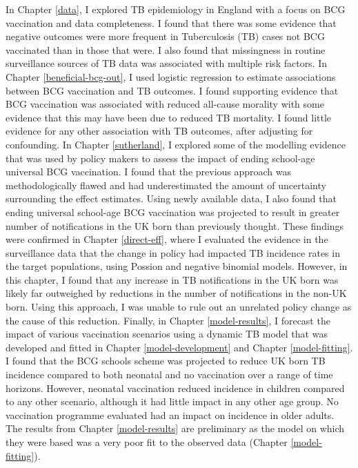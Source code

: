 \documentclass[11pt,twoside]{bristolthesis}
\begin{document}
  In Chapter \ref{data}, I explored TB epidemiology in England with a focus on BCG vaccination and data completeness. I found that there was some evidence that negative outcomes were more frequent in Tuberculosis (TB) cases not BCG vaccinated than in those that were. I also found that missingness in routine surveillance sources of TB data was associated with multiple risk factors. In Chapter \ref{beneficial-bcg-out}, I used logistic regression to estimate associations between BCG vaccination and TB outcomes. I found supporting evidence that BCG vaccination was associated with reduced all-cause morality with some evidence that this may have been due to reduced TB mortality. I found little evidence for any other association with TB outcomes, after adjusting for confounding. In Chapter \ref{sutherland}, I explored some of the modelling evidence that was used by policy makers to assess the impact of ending school-age universal BCG vaccination. I found that the previous approach was methodologically flawed and had underestimated the amount of uncertainty surrounding the effect estimates. Using newly available data, I also found that ending universal school-age BCG vaccination was projected to result in greater number of notifications in the UK born than previously thought. These findings were confirmed in Chapter \ref{direct-eff}, where I evaluated the evidence in the surveillance data that the change in policy had impacted TB incidence rates in the target populations, using Possion and negative binomial models. However, in this chapter, I found that any increase in TB notifications in the UK born was likely far outweighed by reductions in the number of notifications in the non-UK born. Using this approach, I was unable to rule out an unrelated policy change as the cause of this reduction. Finally, in Chapter \ref{model-results}, I forecast the impact of various vaccination scenarios using a dynamic TB model that was developed and fitted in Chapter \ref{model-development} and Chapter \ref{model-fitting}. I found that the BCG schools scheme was projected to reduce UK born TB incidence compared to both neonatal and no vaccination over a range of time horizons. However, neonatal vaccination reduced incidence in children compared to any other scenario, although it had little impact in any other age group. No vaccination programme evaluated had an impact on incidence in older adults. The results from Chapter \ref{model-results} are preliminary as the model on which they were based was a very poor fit to the observed data (Chapter \ref{model-fitting}).
  
\end{document}
